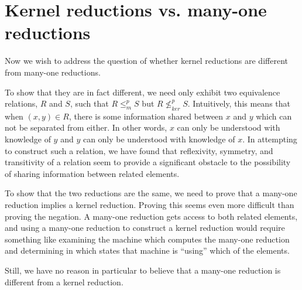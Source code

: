 \documentclass{article}
\theoremstyle{definition} \newtheorem{definition}[definition]{Definition}
\newcommand{\nkr}{\nleq^{p}_{ker}} %
\newcommand{\mor}{\leq^{p}_{m}} %
\begin{document}

\section{Kernel reductions vs. many-one reductions}

Now we wish to address the question of whether kernel reductions are different
from many-one reductions.

To show that they are in fact different, we need only exhibit two equivalence
relations, $R$ and $S$, such that $R\mor S$ but $R\nkr S$. Intuitively, this
means that when $(x,y)\in R$, there is some information shared between $x$ and
$y$ which can not be separated from either. In other words, $x$ can only be
understood with knowledge of $y$ and $y$ can only be understood with knowledge
of $x$. In attempting to construct such a relation, we have found that
reflexivity, symmetry, and transitivity of a relation seem to provide a
significant obstacle to the possibility of sharing information between related
elements.

To show that the two reductions are the same, we need to prove that a many-one
reduction implies a kernel reduction. Proving this seems even more difficult
than proving the negation. A many-one reduction gets access to both related
elements, and using a many-one reduction to construct a kernel reduction would
require something like examining the machine which computes the many-one
reduction and determining in which states that machine is ``using'' which of
the elements.

Still, we have no reason in particular to believe that a many-one reduction is
different from a kernel reduction.

 
\end{document}
